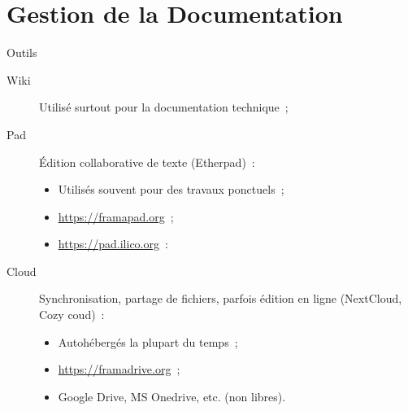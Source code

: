 \section{Gestion de la Documentation}

\begin{frame}[fragile]{Outils}
\begin{description}
 \item [Wiki] Utilisé surtout pour la documentation technique~;
 \pause
 \item [Pad] Édition collaborative de texte (Etherpad)~:
 \begin{itemize}
  \pause
  \item Utilisés souvent pour des travaux ponctuels~;
  \pause
  \item \url{https://framapad.org}~;
  \pause
  \item \url{https://pad.ilico.org}~:
 \end{itemize}
 \pause
 \item [Cloud] Synchronisation, partage de fichiers, parfois édition en ligne (NextCloud, Cozy coud)~:
 \begin{itemize}
  \pause
  \item Autohébergés la plupart du temps~;
  \pause
  \item \url{https://framadrive.org}~;
  \pause
  \item Google Drive, MS Onedrive, etc. (non libres).
 \end{itemize}
\end{description}
\end{frame}

